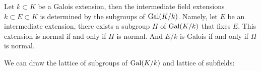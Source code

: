 \begin{prop}
    Let $k\subset K$ be a Galois extension, then the intermediate field extensions $k\subset E\subset K$ is determined by the subgroups of $\text{Gal}(K/k)$. Namely, let $E$ be an intermediate extension, there exists a subgroup $H$ of $\text{Gal}(K/k)$ that fixes $E$. This extension is normal if and only if $H$ is normal. And $E/k$ is Galois if and only if $H$ is normal.
\end{prop}

\begin{prop}
    We can draw the lattice of subgroups of $\text{Gal}(K/k)$ and lattice of subfields:

    

\end{prop}




